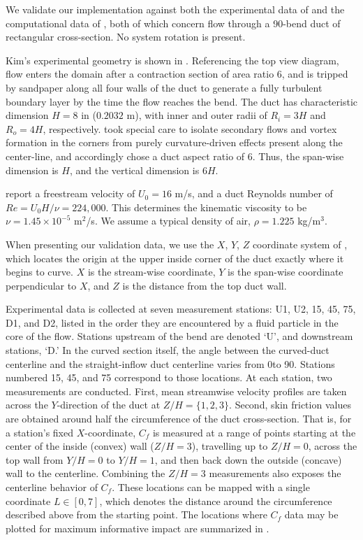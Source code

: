 \documentclass[11pt]{article}
\begin{document}
We validate our implementation against both the experimental data of \citet{kim1994} and the computational data of \citet{shur2000}, both of which concern flow through a 90\degree-bend duct of rectangular cross-section. No system rotation is present.

Kim's experimental geometry is shown in . Referencing the top view diagram, flow enters the domain after a contraction section of area ratio 6, and is tripped by sandpaper along all four walls of the duct to generate a fully turbulent boundary layer by the time the flow reaches the bend. The duct has characteristic dimension $H = 8$ in ($0.2032$ m), with inner and outer radii of $R_i=3H$ and $R_o=4H$, respectively. \citet{kim1994} took special care to isolate secondary flows and vortex formation in the corners from purely curvature-driven effects present along the center-line, and accordingly chose a duct aspect ratio of 6. Thus, the span-wise dimension is $H$, and the vertical dimension is $6H$.

\citet{kim1994} report a freestream velocity of $U_0 = 16$ m/s, and a duct Reynolds number of $Re = U_0 H / \nu = 224,000$. This determines the kinematic viscosity to be $\nu = 1.45 \times 10^{-5}$ m$^2$/s. We assume a typical density of air, $\rho = 1.225$ kg/m$^3$.

When presenting our validation data, we use the $X$, $Y$, $Z$ coordinate system of \citet{kim1994}, which locates the origin at the upper inside corner of the duct exactly where it begins to curve. $X$ is the stream-wise coordinate, $Y$ is the span-wise coordinate perpendicular to $X$, and $Z$ is the distance from the top duct wall.

Experimental data is collected at seven measurement stations: U1, U2, 15, 45, 75, D1, and D2, listed in the order they are encountered by a fluid particle in the core of the flow. Stations upstream of the bend are denoted `U', and downstream stations, `D.' In the curved section itself, the angle between the curved-duct centerline and the straight-inflow duct centerline varies from 0\degree to 90\degree. Stations numbered 15, 45, and 75 correspond to those locations. At each station, two measurements are conducted. First, mean streamwise velocity profiles are taken across the $Y$-direction of the duct at $Z/H = \{1,2,3\}$. Second, skin friction values are obtained around half the circumference of the duct cross-section. That is, for a station's fixed $X$-coordinate, $C_f$ is measured at a range of points starting at the center of the inside (convex) wall ($Z/H = 3$), travelling up to $Z/H=0$, across the top wall from $Y/H=0$ to $Y/H=1$, and then back down the outside (concave) wall to the centerline. Combining the $Z/H=3$ measurements also exposes the centerline behavior of $C_f$. These locations can be mapped with a single coordinate $L \in [0,7]$, which denotes the distance around the circumference described above from the starting point. The locations where $C_f$ data may be plotted for maximum informative impact are summarized in .
\end{document}
